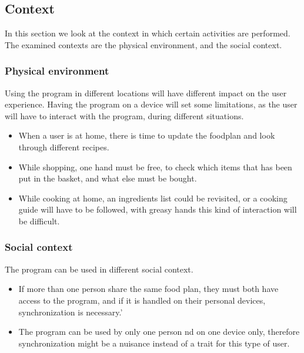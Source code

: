 \subsection{Context}
In this section we look at the context in which certain activities are performed. The examined contexts are the physical environment, and the social context.

\subsubsection{Physical environment}
Using the program in different locations will have different impact on the user experience. Having the program on a device will set some limitations, as the user will have to interact with the program, during different situations.
\begin{itemize}
\item When a user is at home, there is time to update the foodplan and look through different recipes.
\item While shopping, one hand must be free, to check which items that has been put in the basket, and what else must be bought.
\item While cooking at home, an ingredients list could be revisited, or a cooking guide will have to be followed, with greasy hands this kind of interaction will be difficult.
\end{itemize}

\subsubsection{Social context}
The program can be used in different social context.
\begin{itemize}
\item If more than one person share the same food plan, they must both have access to the program, and if it is handled on their personal devices, synchronization is necessary.'
\item The program can be used by only one person nd on one device only, therefore synchronization might be a nuisance instead of a trait for this type of user.
\end{itemize}
